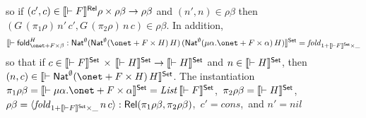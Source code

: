 \documentclass{lmcs}
\theoremstyle{plain}\newtheorem{satz}[thm]{Satz}
\newcommand{\fold}{\mathsf{fold}}
\begin{document}
so if $(c', c) \in \llbracket{\vdash F}\rrbracket^{\mathsf{Rel}} \rho \times
\rho\beta \to \rho\beta$ and $(n', n) \in \rho\beta$ then
$(G \,(\pi_1 \rho)\, n'\, c', G\, (\pi_2 \rho)\, n\, c)
\in \rho \beta$.
In addition,
\[\setsem{\vdash \fold_{\onet + F
    \times \beta}^{H} : \Nat^{\emptyset} (\Nat^{\emptyset} (\onet
  + F \times H)\, H)\, (\Nat^{\emptyset} (\mu \alpha. \onet
  + F \times \alpha)\, H)} =
\mathit{fold}_{1 + \setsem{\vdash F} \times \_}\] so that if $c \in
\llbracket{\vdash F}\rrbracket^{\mathsf{Set}} \,\times\, \llbracket{\vdash H}\rrbracket^{\mathsf{Set}} \to
\llbracket{\vdash H}\rrbracket^{\mathsf{Set}}$ and $n \in \llbracket{\vdash H}\rrbracket^{\mathsf{Set}}$, then
$(n, c) \in \setsem{\vdash \Nat^{\emptyset} (\onet + F \times H)\,
  H}$. The instantiation
$\pi_1 \rho \beta = \setsem{\vdash \mu \alpha. \onet + F \times
  \alpha}=\mathit{List}\,\setsem{\vdash F}$,\, 
$\pi_2 \rho \beta = \llbracket{\vdash H}\rrbracket^{\mathsf{Set}}$,\,
$\rho \beta = \langle {\mathit{fold}_{1 + \llbracket{\vdash F}\rrbracket^{\mathsf{Set}} \times \_}\, n\, c} \rangle :
\mathsf{Rel}(\pi_1 \rho \beta, \pi_2 \rho \beta)$,\,
$c' = \mathit{cons}$,\, and 
$n' = \mathit{nil}$
\end{document}
